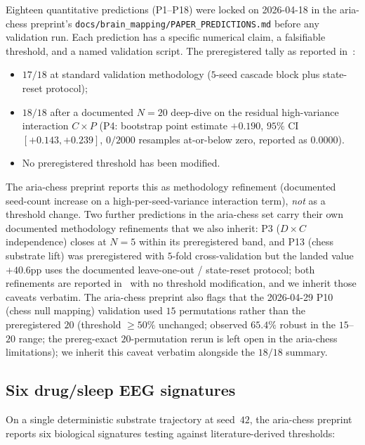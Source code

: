 Eighteen quantitative predictions (P1--P18) were locked on
2026-04-18 in the aria-chess preprint's
\texttt{docs/brain\_mapping/PAPER\_PREDICTIONS.md} before any
validation run. Each prediction has a specific numerical claim, a
falsifiable threshold, and a named validation script. The
preregistered tally as reported in~\citep{SmartAriaChess2026}:

\begin{itemize}\itemsep=2pt
\item $17/18$ at standard validation methodology ($5$-seed
  cascade block plus state-reset protocol);
\item $18/18$ after a documented $N\!=\!20$ deep-dive on the
  residual high-variance interaction $C\!\times\!P$ (P4: bootstrap
  point estimate $+0.190$, $95\%$ CI $[+0.143, +0.239]$,
  $0/2000$ resamples at-or-below zero, reported as $0.0000$).
\item No preregistered threshold has been modified.
\end{itemize}
The aria-chess preprint reports this as methodology refinement
(documented seed-count increase on a high-per-seed-variance
interaction term), \emph{not} as a threshold change. Two further
predictions in the aria-chess set carry their own documented
methodology refinements that we also inherit: P3
($D\!\times\!C$ independence) closes at $N\!=\!5$ within
its preregistered band, and P13 (chess substrate lift) was
preregistered with $5$-fold cross-validation but the
landed value $+40.6$pp uses the documented leave-one-out /
state-reset protocol; both refinements are reported
in~\citep{SmartAriaChess2026} with no threshold modification, and
we inherit those caveats verbatim. The aria-chess preprint also
flags that the 2026-04-29 P10 (chess null mapping) validation used
$15$ permutations rather than the preregistered $20$ (threshold
$\geq 50\%$ unchanged; observed $65.4\%$ robust in the $15$--$20$
range; the prereg-exact $20$-permutation rerun is left open in the
aria-chess limitations); we inherit this caveat verbatim alongside
the $18/18$ summary.

\subsection{Six drug/sleep EEG signatures}

On a single deterministic substrate trajectory at seed~$42$, the
aria-chess preprint reports six biological signatures testing
against literature-derived thresholds:

